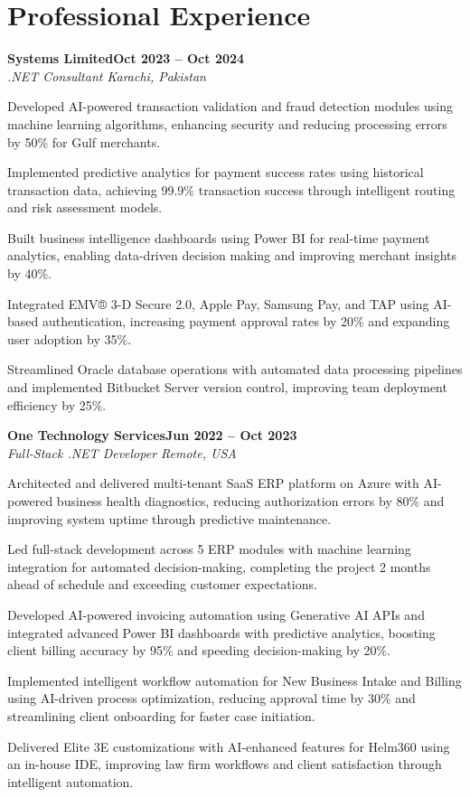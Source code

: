 \documentclass[letterpaper,10pt]{article}
\newcommand{\headingBf}[2]{
  \hspace{10pt}\textbf{#1}\hfill\textbf{#2}\\
}
\newcommand{\headingIt}[2]{
  \hspace{10pt}\textit{#1}\hfill\textit{#2}\\
}
\newenvironment{resume_list}{
  \vspace{-7pt}
  \begin{itemize}[itemsep=-2px, parsep=1pt, leftmargin=30pt]
}{
  \end{itemize}
}
\begin{document}
\section{Professional Experience}

\headingBf{Systems Limited}{Oct 2023 -- Oct 2024}
\headingIt{.NET Consultant \hfill Karachi, Pakistan}{}
\begin{resume_list}
    \item Developed AI-powered transaction validation and fraud detection modules using machine learning algorithms, enhancing security and reducing processing errors by 50\% for Gulf merchants.
    \item Implemented predictive analytics for payment success rates using historical transaction data, achieving 99.9\% transaction success through intelligent routing and risk assessment models.
    \item Built business intelligence dashboards using Power BI for real-time payment analytics, enabling data-driven decision making and improving merchant insights by 40\%.
    \item Integrated EMV® 3-D Secure 2.0, Apple Pay, Samsung Pay, and TAP using AI-based authentication, increasing payment approval rates by 20\% and expanding user adoption by 35\%.
    \item Streamlined Oracle database operations with automated data processing pipelines and implemented Bitbucket Server version control, improving team deployment efficiency by 25\%.
\end{resume_list}

\headingBf{One Technology Services}{Jun 2022 -- Oct 2023}
\headingIt{Full-Stack .NET Developer \hfill Remote, USA}{}
\begin{resume_list}
    \item Architected and delivered multi-tenant SaaS ERP platform on Azure with AI-powered business health diagnostics, reducing authorization errors by 80\% and improving system uptime through predictive maintenance.
    \item Led full-stack development across 5 ERP modules with machine learning integration for automated decision-making, completing the project 2 months ahead of schedule and exceeding customer expectations.
    \item Developed AI-powered invoicing automation using Generative AI APIs and integrated advanced Power BI dashboards with predictive analytics, boosting client billing accuracy by 95\% and speeding decision-making by 20\%.
    \item Implemented intelligent workflow automation for New Business Intake and Billing using AI-driven process optimization, reducing approval time by 30\% and streamlining client onboarding for faster case initiation.
    \item Delivered Elite 3E customizations with AI-enhanced features for Helm360 using an in-house IDE, improving law firm workflows and client satisfaction through intelligent automation.
\end{resume_list}
\end{document}
